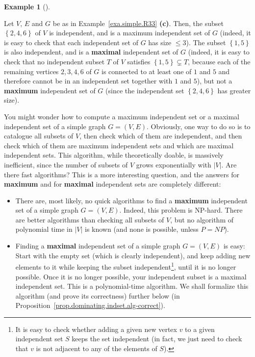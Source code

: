 \documentclass[numbers=enddot,12pt,final,onecolumn,notitlepage]{scrartcl}%
\theoremstyle{definition}
\newtheorem{exam}[theo]{Example}
\newenvironment{example}[1][]
{\begin{exam}[#1]\begin{leftbar}}
{\end{leftbar}\end{exam}}
\newcommand{\set}[1]{\left\{ #1 \right\}}
\newcommand{\abs}[1]{\left| #1 \right|}
\newcommand{\tup}[1]{\left( #1 \right)}
\begin{document}
\begin{example}
Let $V$, $E$ and $G$ be as in Example~\ref{exa.simple.R33}
\textbf{(c)}. Then, the subset $\set{2, 4, 6}$ of $V$ is
independent, and is a maximum independent set of $G$
(indeed, it is easy to check that each independent set of $G$
has size $\leq 3$). The subset $\set{1, 5}$ is also
independent, and is a \textbf{maximal} independent set of $G$
(indeed, it is easy to check that no independent subset $T$
of $V$ satisfies $\set{1, 5} \subsetneq T$, because each of
the remaining vertices $2, 3, 4, 6$ of $G$ is connected to
at least one of $1$ and $5$ and therefore cannot be in an
independent set together with $1$ and $5$), but not a
\textbf{maximum} independent set of $G$ (since the independent
set $\set{2, 4, 6}$ has greater size).
\end{example}

You might wonder how to compute a maximum independent set
or a maximal independent set of a simple graph $G = \tup{V, E}$.
Obviously, one way to do so is to catalogue all subsets of $V$,
then check which of them are independent, and then check which
of them are maximum independent sets and which are maximal
independent sets. This algorithm, while theoretically doable,
is massively inefficient, since the number of subsets of $V$
grows exponentially with $\abs{V}$. Are there fast algorithms?
This is a more interesting question, and the answers for
\textbf{maximum} and for \textbf{maximal} independent sets
are completely different:
\begin{itemize}
 \item There are, most likely, no quick algorithms to find
       a \textbf{maximum} independent set of a simple graph
       $G = \tup{V, E}$. Indeed, this problem is NP-hard. There
       are better algorithms than checking all subsets of $V$,
       but no algorithm of polynomial time in $\abs{V}$ is
       known (and none is possible, unless $P = NP$).
 \item Finding a \textbf{maximal} independent set of a simple
       graph $G = \tup{V, E}$ is easy: Start with the empty
       set (which is clearly independent), and keep adding new
       elements to it while keeping the subset
       independent\footnote{It is easy to check whether
       adding a given new vertex
       $v$ to a given independent set $S$ keeps the set
       independent (in fact, we just need to check that $v$
       is not adjacent to any of the elements of $S$).},
       until it is no longer possible.
       Once it is no longer possible, your independent subset
       is a maximal independent set. This is a polynomial-time
       algorithm. We shall formalize this algorithm (and prove its
       correctness) further below (in
       Proposition~\ref{prop.dominating.indset.alg-correct}).
\end{itemize}
\end{document}
